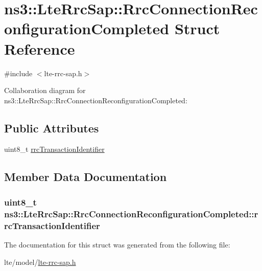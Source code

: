 \hypertarget{structns3_1_1LteRrcSap_1_1RrcConnectionReconfigurationCompleted}{}\section{ns3\+:\+:Lte\+Rrc\+Sap\+:\+:Rrc\+Connection\+Reconfiguration\+Completed Struct Reference}
\label{structns3_1_1LteRrcSap_1_1RrcConnectionReconfigurationCompleted}


{\ttfamily \#include $<$lte-\/rrc-\/sap.\+h$>$}



Collaboration diagram for ns3\+:\+:Lte\+Rrc\+Sap\+:\+:Rrc\+Connection\+Reconfiguration\+Completed\+:
\subsection*{Public Attributes}
\begin{DoxyCompactItemize}
\item 
uint8\+\_\+t \hyperlink{structns3_1_1LteRrcSap_1_1RrcConnectionReconfigurationCompleted_ae3ed8902fd06c26f99b18dc481fa65d9}{rrc\+Transaction\+Identifier}
\end{DoxyCompactItemize}


\subsection{Member Data Documentation}
\subsubsection[{\texorpdfstring{rrc\+Transaction\+Identifier}{rrcTransactionIdentifier}}]{\setlength{\rightskip}{0pt plus 5cm}uint8\+\_\+t ns3\+::\+Lte\+Rrc\+Sap\+::\+Rrc\+Connection\+Reconfiguration\+Completed\+::rrc\+Transaction\+Identifier}\hypertarget{structns3_1_1LteRrcSap_1_1RrcConnectionReconfigurationCompleted_ae3ed8902fd06c26f99b18dc481fa65d9}{}\label{structns3_1_1LteRrcSap_1_1RrcConnectionReconfigurationCompleted_ae3ed8902fd06c26f99b18dc481fa65d9}


The documentation for this struct was generated from the following file\+:\begin{DoxyCompactItemize}
\item 
lte/model/\hyperlink{lte-rrc-sap_8h}{lte-\/rrc-\/sap.\+h}\end{DoxyCompactItemize}
